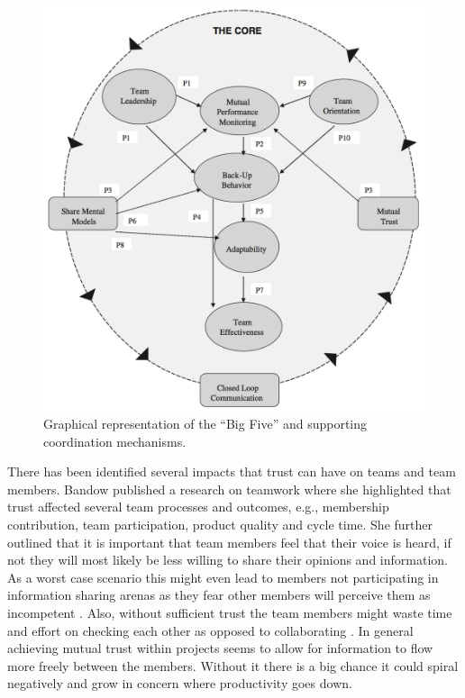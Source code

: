 \begin{figure}
\centering
\includegraphics[width=150mm]{images/salas.png}
\caption{Graphical representation of the ``Big Five'' and supporting coordination mechanisms.}
\label{salas}
\end{figure}

There has been identified several impacts that trust can have on teams and team members. Bandow published a research on teamwork where she highlighted that trust affected several team processes and outcomes, e.g., membership contribution, team participation, product quality and cycle time. She further outlined that it is important that team members feel that their voice is heard, if not they will most likely be less willing to share their opinions and information. As a worst case scenario this might even lead to members not participating in information sharing arenas as they fear other members will perceive them as incompetent \cite{Bandow2001}. Also, without sufficient trust the team members might waste time and effort on checking each other as opposed to collaborating \cite{cooper1998executive}. In general achieving mutual trust within projects seems to allow for information to flow more freely between the members. Without it there is a big chance it could spiral negatively and grow in concern where productivity goes down.

